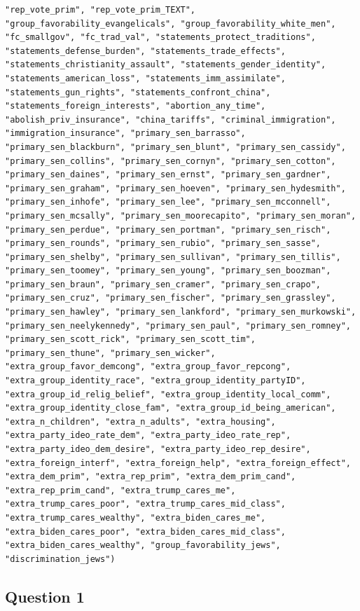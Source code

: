 \documentclass[
]{article}
\begin{document}
\begin{verbatim}
"rep_vote_prim", "rep_vote_prim_TEXT", "group_favorability_evangelicals", "group_favorability_white_men", "fc_smallgov", "fc_trad_val", "statements_protect_traditions", "statements_defense_burden", "statements_trade_effects", "statements_christianity_assault", "statements_gender_identity", "statements_american_loss", "statements_imm_assimilate", "statements_gun_rights", "statements_confront_china", "statements_foreign_interests", "abortion_any_time", "abolish_priv_insurance", "china_tariffs", "criminal_immigration", "immigration_insurance", "primary_sen_barrasso", "primary_sen_blackburn", "primary_sen_blunt", "primary_sen_cassidy", "primary_sen_collins", "primary_sen_cornyn", "primary_sen_cotton", "primary_sen_daines", "primary_sen_ernst", "primary_sen_gardner", "primary_sen_graham", "primary_sen_hoeven", "primary_sen_hydesmith", "primary_sen_inhofe", "primary_sen_lee", "primary_sen_mcconnell", "primary_sen_mcsally", "primary_sen_moorecapito", "primary_sen_moran", "primary_sen_perdue", "primary_sen_portman", "primary_sen_risch", "primary_sen_rounds", "primary_sen_rubio", "primary_sen_sasse", "primary_sen_shelby", "primary_sen_sullivan", "primary_sen_tillis", "primary_sen_toomey", "primary_sen_young", "primary_sen_boozman", "primary_sen_braun", "primary_sen_cramer", "primary_sen_crapo", "primary_sen_cruz", "primary_sen_fischer", "primary_sen_grassley", "primary_sen_hawley", "primary_sen_lankford", "primary_sen_murkowski", "primary_sen_neelykennedy", "primary_sen_paul", "primary_sen_romney", "primary_sen_scott_rick", "primary_sen_scott_tim", "primary_sen_thune", "primary_sen_wicker", "extra_group_favor_demcong", "extra_group_favor_repcong", "extra_group_identity_race", "extra_group_identity_partyID", "extra_group_id_relig_belief", "extra_group_identity_local_comm", "extra_group_identity_close_fam", "extra_group_id_being_american", "extra_n_children", "extra_n_adults", "extra_housing", "extra_party_ideo_rate_dem", "extra_party_ideo_rate_rep", "extra_party_ideo_dem_desire", "extra_party_ideo_rep_desire", "extra_foreign_interf", "extra_foreign_help", "extra_foreign_effect", "extra_dem_prim", "extra_rep_prim", "extra_dem_prim_cand", "extra_rep_prim_cand", "extra_trump_cares_me", "extra_trump_cares_poor", "extra_trump_cares_mid_class", "extra_trump_cares_wealthy", "extra_biden_cares_me", "extra_biden_cares_poor", "extra_biden_cares_mid_class", "extra_biden_cares_wealthy", "group_favorability_jews", "discrimination_jews")
\end{verbatim}

\hypertarget{question-1}{%
\subsection{Question 1}\label{question-1}}
\end{document}
